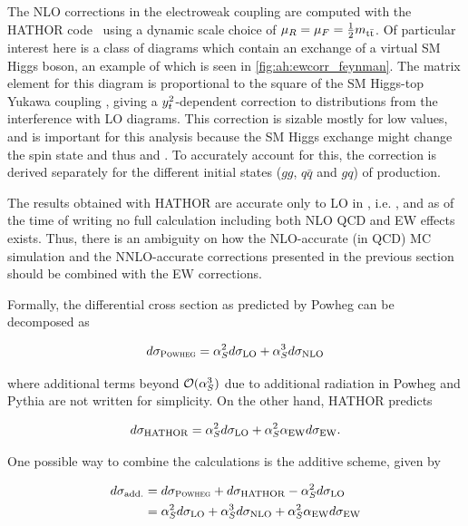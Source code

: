 The NLO corrections in the electroweak coupling \alphaew are computed with the HATHOR code~\cite{Aliev:2010zk, Kuhn:2005it, Kuhn:2006vh, Kuhn:2013zoa} using a dynamic scale choice of $\mu_R = \mu_F = \frac{1}{2} m_{\mathrm{t \bar{t}}}$. Of particular interest here is a class of diagrams which contain an exchange of a virtual SM Higgs boson, an example of which is seen in \cref{fig:ah:ewcorr_feynman}. The matrix element for this diagram is proportional to the square of the SM Higgs-top Yukawa coupling \yt, giving a $y_t^2$-dependent correction to \ttbar distributions from the interference with LO diagrams. This correction is sizable mostly for low \mtt values, and is important for this analysis because the SM Higgs exchange might change the \ttbar spin state and thus \chel and \chan. To accurately account for this, the correction is derived separately for the different initial states ($gg$, $q\bar{q}$ and $gq$) of \ttbar production.

The results obtained with HATHOR are accurate only to LO in \alphas, i.e. , and as of the time of writing no full calculation including both NLO QCD and EW effects exists. Thus, there is an ambiguity on how the NLO-accurate (in QCD) MC simulation and the NNLO-accurate corrections presented in the previous section should be combined with the EW corrections.

Formally, the differential cross section as predicted by Powheg can be decomposed as

\begin{equation}
    d \sigma_{\textsc{Powheg}} = \alpha_S^2 d \sigma_{\mathrm{LO}} + \alpha_S^3 d \sigma_{\mathrm{NLO}}
\end{equation}

\noindent where additional terms beyond $\mathcal{O}(\alpha_S^3)$ due to additional radiation in Powheg and Pythia are not written for simplicity. On the other hand, HATHOR predicts

\begin{equation}
    d \sigma_{\mathrm{HATHOR}} = \alpha_S^2 d \sigma_{\mathrm{LO}} + \alpha_S^2 \alpha_{\mathrm{EW}} d \sigma_{\mathrm{EW}}.
\end{equation}

One possible way to combine the calculations is the additive scheme, given by


\begin{equation}
\begin{split}
\label{eq:ah:ewadd}
    d \sigma_{\mathrm{add.}} &= d \sigma_{\textsc{Powheg}} + d \sigma_{\mathrm{HATHOR}} - \alpha_S^2 d \sigma_{\mathrm{LO}} \\
    &= \alpha_S^2 d \sigma_{\mathrm{LO}} + \alpha_S^3 d \sigma_{\mathrm{NLO}} + \alpha_S^2 \alpha_{\mathrm{EW}} d \sigma_{\mathrm{EW}}
\end{split}
\end{equation}

